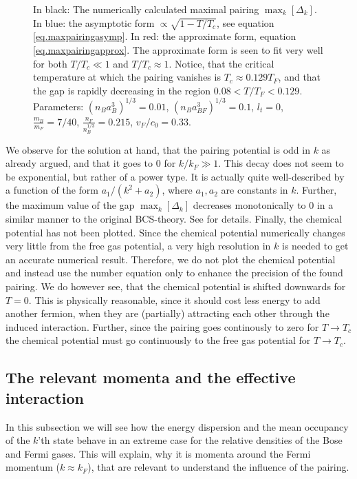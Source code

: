 \begin{figure} 
\begin{center}  
  
\caption{In black: The numerically calculated maximal pairing $\max_k[\Delta_k]$. In blue: the asymptotic form $\propto \sqrt{1-T/T_c}$, see equation \eqref{eq.maxpairingasymp}. In red: the approximate form, equation \eqref{eq.maxpairingapprox}. The approximate form is seen to fit very well for both $T/T_c \ll 1$ and $T/T_c \approx 1$. Notice, that the critical temperature at which the pairing vanishes is $T_c \approx 0.129 T_F$, and that the gap is rapidly decreasing in the region $0.08< T/T_F < 0.129$. Parameters: $(n_Ba_B^3)^{1/3} = 0.01$, $(n_Ba_{BF}^3)^{1/3} = 0.1$, $l_t = 0$, $\frac{m_B}{m_F} = 7/40$, $\frac{n_F}{n_B^{1/3}} = 0.215$, $v_F/c_0 = 0.33$. }  
\label{fig.maxkDeltakTdepend}  
\end{center}    
\end{figure}

We observe for the solution at hand, that the pairing potential is odd in $k$ as already argued, and that it goes to 0 for $k/k_F \gg 1$. This decay does not seem to be exponential, but rather of a power type. It is actually quite well-described by a function of the form $a_1/(k^2 + a_2)$, where $a_1,a_2$ are constants in $k$. Further, the maximum value of the gap $\max_k[\Delta_k]$ decreases monotonically to 0 in a similar manner to the original BCS-theory. See \cite{Tinkham, BruusFlensberg, PlischkeStatPhys} for details. Finally, the chemical potential has not been plotted. Since the chemical potential numerically changes very little from the free gas potential, a very high resolution in $k$ is needed to get an accurate numerical result. Therefore, we do not plot the chemical potential and instead use the number equation only to enhance the precision of the found pairing. We do however see, that the chemical potential is shifted downwards for $T = 0$. This is physically reasonable, since it should cost less energy to add another fermion, when they are (partially) attracting each other through the induced interaction. Further, since the pairing goes continously to zero for $T\to T_c$ the chemical potential must go continuously to the free gas potential for $T\to T_c$. 


\subsection{The relevant momenta and the effective interaction}
\label{subsec.relevantmomenta.effectiveinteraction}
In this subsection we will see how the energy dispersion and the mean occupancy of the $k$'th state behave in an extreme case for the relative densities of the Bose and Fermi gases. This will explain, why it is momenta around the Fermi momentum ($k \approx k_F$), that are relevant to understand the influence of the pairing. 

